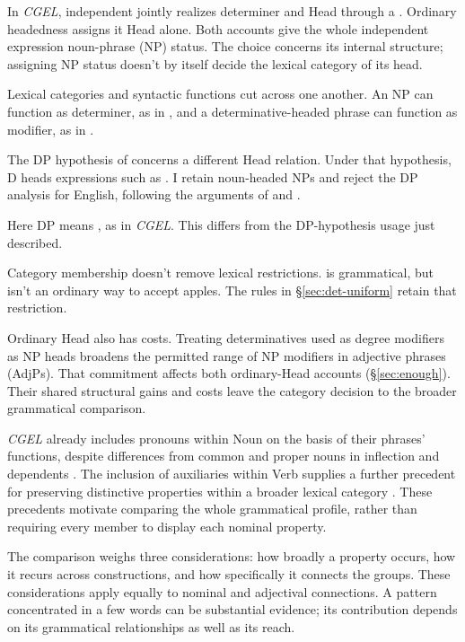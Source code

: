 \documentclass[12pt]{article}
\begin{document}
In \textit{CGEL}, independent  jointly realizes determiner and Head through a  \citep[410--412]{huddleston2002}. Ordinary headedness assigns it Head alone. Both accounts give the whole independent expression noun-phrase (NP) status. The choice concerns its internal structure; assigning NP status doesn't by itself decide the lexical category of its head.

Lexical categories and syntactic functions cut across one another. An NP can function as determiner, as in , and a determinative-headed phrase can function as modifier, as in  \citep{payne2010,pullummiller2022nps}.

The DP hypothesis of \textcite{abney1987} concerns a different Head relation. Under that hypothesis, D heads expressions such as . I retain noun-headed NPs and reject the DP analysis for English, following the arguments of \textcite{pullummiller2022nps} and \textcite{bruening2020nominal}.

Here DP means , as in \textit{CGEL}. This differs from the DP-hypothesis usage just described.

Category membership doesn't remove lexical restrictions.  is grammatical, but  isn't an ordinary way to accept apples. The rules in §\ref{sec:det-uniform} retain that restriction.

Ordinary Head also has costs. Treating determinatives used as degree modifiers as NP heads broadens the permitted range of NP modifiers in adjective phrases (AdjPs). That commitment affects both ordinary-Head accounts (§\ref{sec:enough}). Their shared structural gains and costs leave the category decision to the broader grammatical comparison.

\textit{CGEL} already includes pronouns within Noun on the basis of their phrases' functions, despite differences from common and proper nouns in inflection and dependents \citep[327--328]{huddleston2002}. The inclusion of auxiliaries within Verb supplies a further precedent for preserving distinctive properties within a broader lexical category \citep{pullumwilson1977}. These precedents motivate comparing the whole grammatical profile, rather than requiring every member to display each nominal property.

The comparison weighs three considerations: how broadly a property occurs, how it recurs across constructions, and how specifically it connects the groups. These considerations apply equally to nominal and adjectival connections. A pattern concentrated in a few words can be substantial evidence; its contribution depends on its grammatical relationships as well as its reach.
\end{document}
